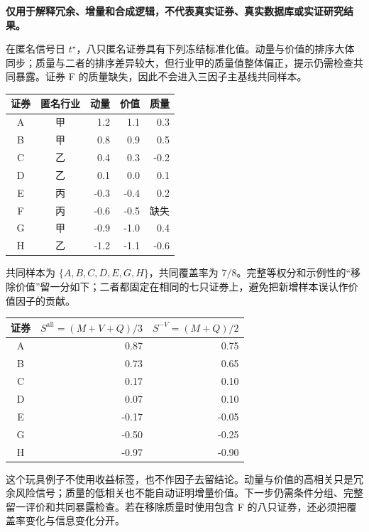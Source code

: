 \begin{casebox}
\textbf{仅用于解释冗余、增量和合成逻辑，不代表真实证券、真实数据库或实证研究结果。}

在匿名信号日 \(t^\star\)，八只匿名证券具有下列冻结标准化值。动量与价值的排序大体同步；质量与二者的排序差异较大，但行业甲的质量值整体偏正，提示仍需检查共同暴露。证券 F 的质量缺失，因此不会进入三因子主基线共同样本。

\begin{center}
\footnotesize
\begin{tabular}{c c r r r}
  \toprule
  证券 & 匿名行业 & 动量 & 价值 & 质量 \\
  \midrule
  A & 甲 & 1.2 & 1.1 & 0.3 \\
  B & 甲 & 0.8 & 0.9 & 0.5 \\
  C & 乙 & 0.4 & 0.3 & -0.2 \\
  D & 乙 & 0.1 & 0.0 & 0.1 \\
  E & 丙 & -0.3 & -0.4 & 0.2 \\
  F & 丙 & -0.6 & -0.5 & 缺失 \\
  G & 甲 & -0.9 & -1.0 & 0.4 \\
  H & 乙 & -1.2 & -1.1 & -0.6 \\
  \bottomrule
\end{tabular}
\end{center}

共同样本为 \(\{A,B,C,D,E,G,H\}\)，共同覆盖率为 \(7/8\)。完整等权分和示例性的“移除价值”留一分如下；二者都固定在相同的七只证券上，避免把新增样本误认作价值因子的贡献。

\begin{center}
\footnotesize
\begin{tabular}{c r r}
  \toprule
  证券 & \(S^{\mathrm{all}}=(M+V+Q)/3\) & \(S^{-V}=(M+Q)/2\) \\
  \midrule
  A & 0.87 & 0.75 \\
  B & 0.73 & 0.65 \\
  C & 0.17 & 0.10 \\
  D & 0.07 & 0.10 \\
  E & -0.17 & -0.05 \\
  G & -0.50 & -0.25 \\
  H & -0.97 & -0.90 \\
  \bottomrule
\end{tabular}
\end{center}
\end{casebox}

这个玩具例子不使用收益标签，也不作因子去留结论。动量与价值的高相关只是冗余风险信号；质量的低相关也不能自动证明增量价值。下一步仍需条件分组、完整留一评价和共同暴露检查。若在移除质量时使用包含 F 的八只证券，还必须把覆盖率变化与信息变化分开。

